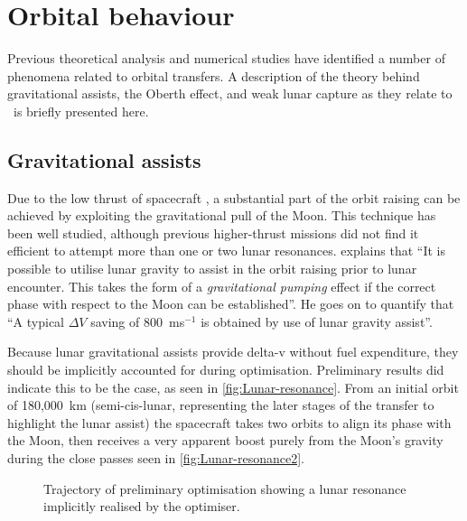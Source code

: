 


\section{Orbital behaviour}

Previous theoretical analysis and numerical studies have identified a number of phenomena related to orbital transfers. A description of the theory behind gravitational assists, the Oberth effect, and weak lunar capture as they relate to \BW\ is briefly presented here.

\subsection{Gravitational assists} \label{sub:Grav-assist}

Due to the low thrust of spacecraft \BW, a substantial part of the orbit raising can be achieved by exploiting the gravitational pull of the Moon. This technique has been well studied, although previous higher-thrust missions did not find it efficient to attempt more than one or two lunar resonances. \textcite{Kemble2006} explains that \enquote{It is possible to utilise lunar gravity to assist in the orbit raising prior to lunar encounter. This takes the form of a \emph{gravitational pumping} effect if the correct phase with respect to the Moon can be established}. He goes on to quantify that \enquote{A typical $\Delta V$ saving of 800~ms$^{-1}$ is obtained by use of lunar gravity assist}. 

Because lunar gravitational assists provide delta-v without fuel expenditure, they should be implicitly accounted for during optimisation. Preliminary results did indicate this to be the case, as seen in \autoref{fig:Lunar-resonance}. From an initial orbit of 180,000~km (semi-cis-lunar, representing the later stages of the transfer to highlight the lunar assist) the spacecraft takes two orbits to align its phase with the Moon, then receives a very apparent boost purely from the Moon's gravity during the close passes seen in \autoref{fig:Lunar-resonance2}.

\begin{figure}
\centering
\def\svgwidth{\figurewidth}

\caption{Trajectory of preliminary optimisation showing a lunar resonance implicitly realised by the optimiser.} \label{fig:Lunar-resonance}
\end{figure}

